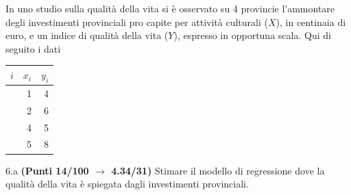 \documentclass[
  11pt,
]{book}
\theoremstyle{mytheoremstyle}
\theoremstyle{mydefstyle}
\begin{document}
In uno studio sulla qualità della vita si è osservato su 4 provincie l'ammontare degli investimenti provinciali pro capite per attività culturali (\(X\)), in centinaia di euro, e un indice di qualità della vita (\(Y\)), espresso in opportuna scala. Qui di seguito i dati

\begin{table}[H]
\centering
\begin{tabular}{>{\raggedright\arraybackslash}p{3em}rr}
\toprule
$i$ & $x_i$ & $y_i$\\
\midrule
\cellcolor[HTML]{E6E6E6}{1} & 1 & 4\\
\cellcolor[HTML]{E6E6E6}{2} & 2 & 6\\
\cellcolor[HTML]{E6E6E6}{3} & 4 & 5\\
\cellcolor[HTML]{E6E6E6}{4} & 5 & 8\\
\bottomrule
\end{tabular}
\end{table}

6.a \textbf{(Punti 14/100 \(\rightarrow\) 4.34/31)} Stimare il modello di regressione dove la qualità della vita è spiegata dagli investimenti provinciali.
\end{document}
